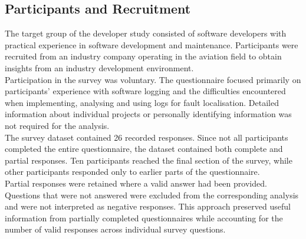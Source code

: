 \subsection{Participants and Recruitment}
The target group of the developer study consisted of software developers with
practical experience in software development and maintenance. Participants were
recruited from an industry company operating in the aviation field to obtain
insights from an industry development environment.
\\
Participation in the survey was voluntary. The questionnaire focused primarily on
participants’ experience with software logging and the difficulties encountered when
implementing, analysing and using logs for fault localisation. Detailed information
about individual projects or personally identifying information was not required for
the analysis.
\\
The survey dataset contained 26 recorded responses. Since not all participants
completed the entire questionnaire, the dataset contained both complete and partial
responses. Ten participants reached the final section of the survey, while other
participants responded only to earlier parts of the questionnaire.
\\
Partial responses were retained where a valid answer had been provided. Questions
that were not answered were excluded from the corresponding analysis and were not
interpreted as negative responses. This approach preserved useful information from
partially completed questionnaires while accounting for the number of valid
responses across individual survey questions.

